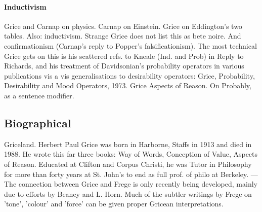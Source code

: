 \documentclass[10pt,titlepage]{book}
\begin{document}
{\paragraph{Inductivism}

Grice and Carnap on physics. Carnap on Einstein. Grice on 
Eddington's two  tables. Also: 
inductivism.  Strange Grice does not list this as bete noire. And 
confirmationism (Carnap's  reply to Popper's falsificationism). The most technical 
Grice gets on this is  his scattered refs. to Kneale (Ind. and Prob) in Reply 
to Richards, and his  treatment of Davidsonian's probability operators in 
various publications vis a  vis generalisations to desirability operators:  
Grice, Probability, Desirability and Mood  Operators, 1973. Grice Aspects of 
Reason. On Probably, as a sentence modifier.

\subsection{Biographical}

Griceland.
Herbert Paul Grice was born in Harborne, Staffs 
in 1913 and died in  1988. He wrote this far three books: Way of Words, 
Conception of Value, Aspects  of Reason. Educated at Clifton and Corpus Christi, 
he was Tutor in Philosophy  for more than forty years at St. John's to end 
as full prof. of philo at  Berkeley. ---  The connection between Grice and 
Frege is only recently being developed, mainly  due to efforts by Beaney and 
L. Horn. Much of the subtler writings by Frege on  'tone', 'colour' and 
'force' can be given proper Gricean  interpretations. 

}
\end{document}
